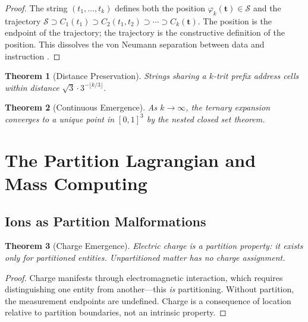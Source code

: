 \documentclass[11pt,twocolumn,a4paper]{article}
\newtheorem{theorem}{Theorem}[section]
\theoremstyle{definition}
\theoremstyle{remark}
\newcommand{\Sspace}{\mathcal{S}}
\begin{document}
\begin{proof}
The string $(t_1, \ldots, t_k)$ defines both the position $\varphi_k(\mathbf{t}) \in \Sspace$ and the trajectory $\Sspace \supset C_1(t_1) \supset C_2(t_1, t_2) \supset \cdots \supset C_k(\mathbf{t})$. The position is the endpoint of the trajectory; the trajectory is the constructive definition of the position. This dissolves the von Neumann separation between data and instruction \citep{vonneumann1945}.
\end{proof}

\begin{theorem}[Distance Preservation]
\label{thm:distance}
Strings sharing a $k$-trit prefix address cells within distance $\sqrt{3} \cdot 3^{-\lfloor k/3 \rfloor}$.
\end{theorem}

\begin{theorem}[Continuous Emergence]
\label{thm:continuous}
As $k \to \infty$, the ternary expansion converges to a unique point in $[0,1]^3$ by the nested closed set theorem.
\end{theorem}

\section{The Partition Lagrangian and Mass Computing}
\label{sec:lagrangian}

\subsection{Ions as Partition Malformations}

\begin{theorem}[Charge Emergence]
\label{thm:charge}
Electric charge is a partition property: it exists only for partitioned entities. Unpartitioned matter has no charge assignment.
\end{theorem}

\begin{proof}
Charge manifests through electromagnetic interaction, which requires distinguishing one entity from another---this \emph{is} partitioning. Without partition, the measurement endpoints are undefined. Charge is a consequence of location relative to partition boundaries, not an intrinsic property.
\end{proof}
\end{document}
